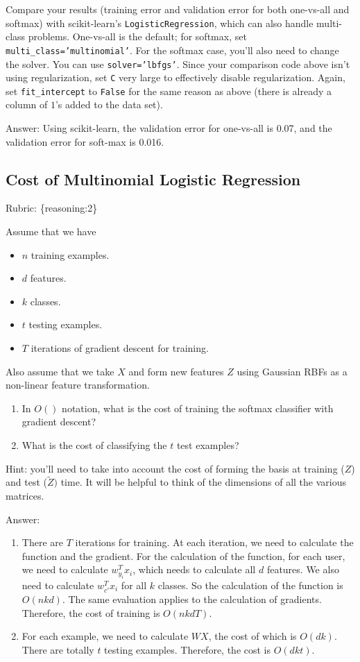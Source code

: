 \documentclass{article}
\def\rubric#1{\gre{Rubric: \{#1\}}}{}
\def\blu#1{{\color{blu}#1}}
\def\gre#1{{\color{gre}#1}}
\def\items#1{\begin{itemize}#1\end{itemize}}
\def\enum#1{\begin{enumerate}#1\end{enumerate}}
\begin{document}
Compare your results (training error and validation error for both one-vs-all and softmax) with scikit-learn's \texttt{LogisticRegression},
which can also handle multi-class problems.
One-vs-all is the default; for softmax, set \texttt{multi\string_class='multinomial'}. For the softmax case,
you'll also need to change the solver. You can use \texttt{solver='lbfgs'}.
Since your comparison code above isn't using regularization, set \texttt{C} very large to effectively disable regularization.
Again, set \texttt{fit\string_intercept} to \texttt{False} for the same reason as above (there is already a column of $1$'s added to the data set).

\gre{Answer:
Using scikit-learn, the validation error for one-vs-all is 0.07, and the validation error for soft-max is 0.016.}

\subsection{Cost of Multinomial Logistic Regression}
\rubric{reasoning:2}

Assume that we have
\items{
\item $n$ training examples.
\item $d$ features.
\item $k$ classes.
\item $t$ testing examples.
\item $T$ iterations of gradient descent for training.
}
Also assume that we take $X$ and form new features $Z$ using Gaussian RBFs as a non-linear feature transformation.
\blu{\enum{
\item In $O()$ notation, what is the cost of training the softmax classifier with gradient descent?
\item What is the cost of classifying the $t$ test examples?
}
}
Hint: you'll need to take into account the cost of forming the basis at training ($Z$) and test ($\tilde{Z})$ time. It will be helpful to think of the dimensions of all the various matrices.

\gre{Answer:
\begin{enumerate}
    \item There are $T$ iterations for training. At each iteration, we need to calculate the function and the gradient. For the calculation of the function, for each user, we need to calculate $w_{y_i}^Tx_i$, which needs to calculate all $d$ features. We also need to calculate $w_{c'}^T x_i$ for all $k$ classes. So the calculation of the function is $O(nkd)$. The same evaluation applies to the calculation of gradients.
    Therefore, the cost of training is $O(nkdT)$.
    \item For each example, we need to calculate $WX$, the cost of which is $O(dk)$. There are totally $t$ testing examples. Therefore, the cost is $O(dkt)$.
\end{enumerate}
}
\end{document}
